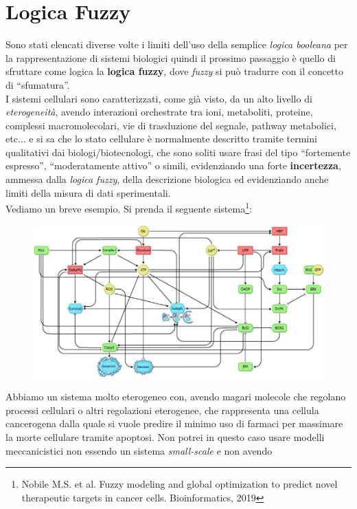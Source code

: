 \documentclass[a4paper,12pt, oneside]{book}
\begin{document}
\section{Logica Fuzzy}
Sono stati elencati diverse volte i limiti dell'uso della semplice
\textit{logica booleana} per la rappresentazione di sistemi biologici quindi il
prossimo passaggio è quello di sfruttare come logica la \textbf{logica fuzzy},
dove \textit{fuzzy} si può tradurre con il concetto di ``sfumatura''.\\
I sistemi cellulari sono caratterizzati, come già visto, da un alto livello di
\textit{eterogeneità}, avendo interazioni orchestrate tra ioni, metaboliti,
proteine, complessi macromolecolari, vie di trasduzione del segnale, pathway
metabolici, etc$\ldots$ e si sa che lo stato cellulare è normalmente descritto
tramite termini qualitativi dai biologi/biotecnologi, che sono soliti usare
frasi del tipo ``fortemente espresso'', ``moderatamente attivo'' o simili,
evidenziando una forte \textbf{incertezza}, ammessa dalla \textit{logica fuzzy},
della descrizione biologica ed evidenziando anche limiti della misura di dati
sperimentali. \\
Vediamo un breve esempio. Si prenda il seguente sistema\footnote{Nobile M.S. et
  al. Fuzzy modeling and global optimization to predict novel therapeutic
  targets in cancer cells. Bioinformatics, 2019}: 
\begin{figure}[H]
  \centering
  \includegraphics[scale = 1.60]{img/fuz1.jpg}
\end{figure}
Abbiamo un sistema molto eterogeneo con, avendo magari molecole che regolano
processi cellulari o altri regolazioni eterogenee, che rappresenta una cellula
cancerogena dalla quale si vuole predire il minimo uso di farmaci per massimare
la morte cellulare tramite apoptosi. Non potrei in questo caso usare modelli
meccanicistici non essendo un sistema \textit{small-scale} e non avendo
\end{document}
